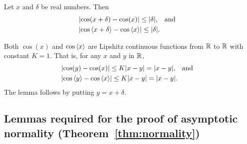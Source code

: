 \documentclass[journal]{IEEEtran}
\begin{document}
\begin{lemma}\label{lem:coslipshitz}
Let $x$ and $\delta$ be real numbers.  Then
\begin{align*}
&{\left\vert \cos(x + \delta) - \cos(x) \right\vert} \leq {\left\vert \delta \right\vert}, \;\;\; \text{and} \\
&{\left\vert \cos\left\langle x + \delta \right\rangle - \cos\left\langle x \right\rangle \right\vert} \leq {\left\vert \delta \right\vert}.
\end{align*}
\end{lemma}
\begin{IEEEproof}
Both $\cos(x)$ and $\cos\left\langle x \right\rangle$ are Lipshitz continuous functions from ${\mathbb R}$ to ${\mathbb R}$ with constant $K=1$.  That is, for any $x$ and $y$ in ${\mathbb R}$,
\begin{align*}
&{\left\vert \cos(y) - \cos(x) \right\vert} \leq K{\left\vert x-y \right\vert} = {\left\vert x-y \right\vert}, \;\;\; \text{and} \\
&{\left\vert \cos\left\langle y \right\rangle - \cos\left\langle x \right\rangle \right\vert} \leq K{\left\vert x-y \right\vert} = {\left\vert x-y \right\vert}.
\end{align*}
 The lemma follows by putting $y = x + \delta$.
\end{IEEEproof}

\subsection{Lemmas required for the proof of asymptotic normality (Theorem~\ref{thm:normality}) } \label{sec:proof-asympt-normappendix}
\end{document}
